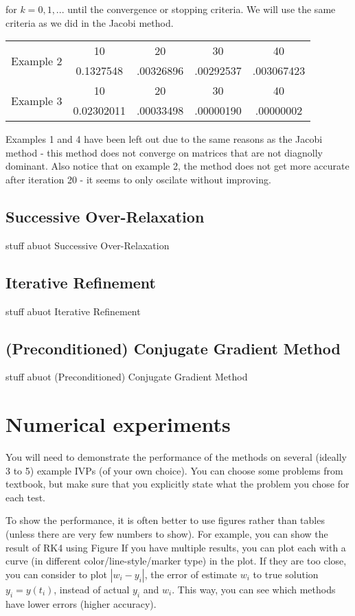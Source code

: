 \documentclass[11pt]{article}	%
\begin{document}
for $k = 0, 1, ...$ until the convergence or stopping criteria. We will use the same criteria as we did in the Jacobi method.

\begin{center}
    \begin{tabular}{||c|c|c|c|c||}
        \hline
        \multirow{2}{5em}{Example 2} & 10 & 20 & 30 & 40 \\ [.25em]
        & 0.1327548 & .00326896 & .00292537 & .003067423 \\ [.25em]
        \hline \hline
        \multirow{2}{5em}{Example 3} & 10 & 20 & 30 & 40 \\ [.25em]
        & 0.02302011 & .00033498 & .00000190 & .00000002 \\ [.25em]
        \hline
    \end{tabular}
\end{center}
Examples 1 and 4 have been left out due to the same reasons as the Jacobi method - this method does not converge on matrices that are not diagnolly dominant. Also notice that on example 2, the method does not get more accurate after iteration 20 - it seems to only oscilate without improving.

\subsection{Successive Over-Relaxation}
stuff abuot Successive Over-Relaxation

\subsection{Iterative Refinement}
stuff abuot Iterative Refinement

\subsection{(Preconditioned) Conjugate Gradient Method}
stuff abuot (Preconditioned) Conjugate Gradient Method

\section{Numerical experiments}
You will need to demonstrate the performance
of the methods on several (ideally 3 to 5) example IVPs (of your own choice).
You can choose some problems from textbook, but make sure that you
explicitly state what the problem you chose for each test.

To show the performance, it is often better to use figures
rather than tables (unless there are very few numbers to show).
For example, you can show the result of RK4
using Figure If you have multiple results, you can plot each
with a curve (in different color/line-style/marker type) in the plot. If they are too close, you can consider to
plot $|w_i-y_i|$, the error of estimate $w_i$ to true solution $y_i=y(t_i)$,
instead of actual $y_i$ and $w_i$. This way, you can see which methods have lower errors (higher accuracy).
\end{document}
